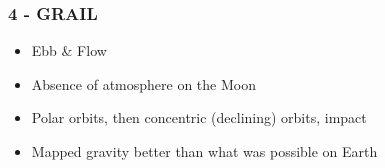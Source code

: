 \documentclass[aspectratio=169]{beamer}
\begin{document}

\begin{frame}
  \frametitle{4 - GRAIL}
\begin{center}
\begin{itemize}
 \item Ebb \& Flow 
 \item Absence of atmosphere on the Moon
 \item Polar orbits, then concentric (declining) orbits, impact 
 \item Mapped gravity better than what was possible on Earth
\end{itemize}
\end{center}
\end{frame}


{
\begin{frame}[plain]
\end{frame}}

\end{document}
